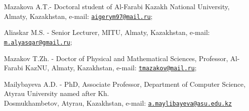 \begin{authorinfo}
Mazakova A.T.- Doctoral student of Al-Farabi Kazakh National University,
Almaty, Kazakhstan, e-mail:
\href{mailto:aigerym97@mail.ru}{\nolinkurl{aigerym97@mail.ru}};

Aliaskar M.S. - Senior Lecturer, MITU, Almaty, Kazakhstan, e-mail:
\href{mailto:m.alyasqar@gmail.ru}{\nolinkurl{m.alyasqar@gmail.ru}};

Mazakov T.Zh. - Doctor of Physical and Mathematical Sciences, Professor,
Al-Farabi KazNU, Almaty, Kazakhstan, e-mail:
\href{mailto:tmazakov@mail.ru}{\nolinkurl{tmazakov@mail.ru}};

Mailybayeva A.D. - PhD, Associate Professor, Department of Computer
Science, Atyrau University named after Kh. \\Dosmukhambetov, Atyrau,
Kazakhstan, e-mail:
\href{mailto:a.maylibayeva@asu.edu.kz}{\nolinkurl{a.maylibayeva@asu.edu.kz}}
\end{authorinfo}
